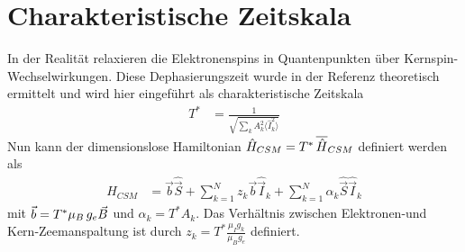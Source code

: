 \section{Charakteristische Zeitskala}
In der Realität relaxieren die Elektronenspins in Quantenpunkten über Kernspin-Wechselwirkungen. Diese Dephasierungszeit wurde in der 
Referenz \cite{PhysRevB.65.205309} theoretisch ermittelt und wird hier eingeführt als charakteristische Zeitskala
\begin{align}\label{charakteristische_Zeit}
    T^* &= \frac{1}{\sqrt{\sum_k A_k^2\langle \hat{I}_k^2 \rangle}}
\end{align}
Nun kann der dimensionslose Hamiltonian $\hat{H}_{CSM} = T^*\thinspace\overline{\hat{H}}_{CSM}$ definiert werden als
\begin{align}
    \hat{H}_{CSM} &= \vec{b}\hat{\vec{S}} +  \sum_{k=1}^{N}z_k\vec{b}\hat{\vec{I}}_k + \sum_{k=1}^{N} \alpha_k \hat{\vec{S}}\hat{\vec{I}}_k
\end{align}
mit $\vec{b}=T^*\mu_B\thinspace g_e \vec{B}$ und $\alpha_k = T^* A_k$. Das Verhältnis zwischen Elektronen-und Kern-Zeemanspaltung ist 
durch $z_k=T^*\frac{\mu_I g_k}{\mu_B g_e}$ definiert.


